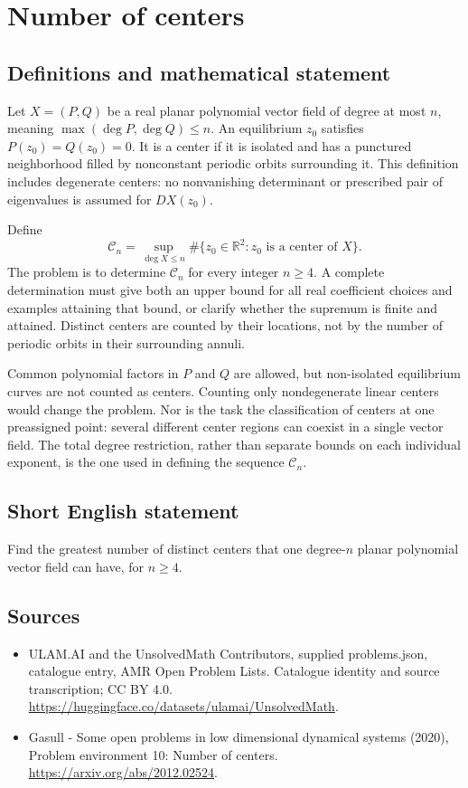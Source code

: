 \documentclass[11pt,a4paper]{article}
\begin{document}
\section*{Number of centers}\label{statement}

\subsection{Definitions and mathematical statement}
Let $X=(P,Q)$ be a real planar polynomial vector field of degree at most $n$,
meaning $\max(\deg P,\deg Q)\le n$. An equilibrium $z_0$ satisfies
$P(z_0)=Q(z_0)=0$. It is a center if it is isolated and has a punctured
neighborhood filled by nonconstant periodic orbits surrounding it.
This definition includes degenerate centers: no nonvanishing determinant
or prescribed pair of eigenvalues is assumed for $DX(z_0)$.

Define
\[
 \mathcal C_n=\sup_{\deg X\le n}
       \#\{z_0\in\mathbb R^2:z_0\text{ is a center of }X\}.
\]
The problem is to determine $\mathcal C_n$ for every integer $n\ge4$.
A complete determination must give both an upper bound for all real
coefficient choices and examples attaining that bound, or clarify whether
the supremum is finite and attained. Distinct centers are counted by their
locations, not by the number of periodic orbits in their surrounding annuli.

Common polynomial factors in $P$ and $Q$ are allowed, but non-isolated
equilibrium curves are not counted as centers. Counting only nondegenerate
linear centers would change the problem. Nor is the task the classification
of centers at one preassigned point: several different center regions can
coexist in a single vector field. The total degree restriction, rather than
separate bounds on each individual exponent, is the one used in defining
the sequence $\mathcal C_n$.
\subsection{Short English statement}
Find the greatest number of distinct centers that one degree-$n$ planar polynomial vector field can have, for $n\ge4$.
\subsection{Sources}
\begin{itemize}
\item[S1] ULAM.AI and the UnsolvedMath Contributors, supplied problems.json, catalogue entry, AMR Open Problem Lists. Catalogue identity and source transcription; CC BY 4.0.
\url{https://huggingface.co/datasets/ulamai/UnsolvedMath}.
\item[S2] Gasull - Some open problems in low dimensional dynamical systems (2020), Problem environment 10: Number of centers. 
\url{https://arxiv.org/abs/2012.02524}.
\end{itemize}
\end{document}
